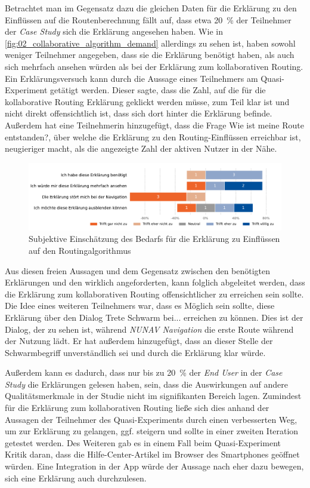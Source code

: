 Betrachtet man im Gegensatz dazu die gleichen Daten für die Erklärung zu den Einflüssen auf die Routenberechnung fällt auf, dass etwa 20~\% der Teilnehmer der \textit{Case Study} sich die Erklärung angesehen haben. Wie in \autoref{fig:02_collaborative_algorithm_demand} allerdings zu sehen ist, haben sowohl weniger Teilnehmer angegeben, dass sie die Erklärung benötigt haben, als auch sich mehrfach ansehen würden als bei der Erklärung zum kollaborativen Routing. Ein Erklärungsversuch kann durch die Aussage eines Teilnehmers am Quasi-Experiment getätigt werden. Dieser sagte, dass die Zahl, auf die für die kollaborative Routing Erklärung geklickt werden müsse, zum Teil klar ist und nicht direkt offensichtlich ist, dass sich dort hinter die Erklärung befinde. Außerdem hat eine Teilnehmerin hinzugefügt, dass die Frage \glqq Wie ist meine Route entstanden?\grqq{}, über welche die Erklärung zu den Routing-Einflüssen erreichbar ist, neugieriger macht, als die angezeigte Zahl der aktiven Nutzer in der Nähe.

\begin{figure}[htb!]
    \centering
    \includegraphics[width=\textwidth]{contents/06_model_evaluation/02_evaluation/res/qualitativeFeedback-02_collaborative_algorithm_demand.pdf}
    \caption{Subjektive Einschätzung des Bedarfs für die Erklärung zu Einflüssen auf den Routingalgorithmus}
    \label{fig:02_collaborative_algorithm_demand}
\end{figure}

Aus diesen freien Aussagen und dem Gegensatz zwischen den benötigten Erklärungen und den wirklich angeforderten, kann folglich abgeleitet werden, dass die Erklärung zum kollaborativen Routing offensichtlicher zu erreichen sein sollte. Die Idee eines weiteren Teilnehmers war, dass es Möglich sein sollte, diese Erklärung über den Dialog \glqq Trete Schwarm bei...\grqq{} erreichen zu können. Dies ist der Dialog, der zu sehen ist, während \textit{NUNAV Navigation} die erste Route während der Nutzung lädt. Er hat außerdem hinzugefügt, dass an dieser Stelle der Schwarmbegriff unverständlich sei und durch die Erklärung klar würde.

Außerdem kann es dadurch, dass nur bis zu 20~\% der \textit{End User} in der \textit{Case Study} die Erklärungen gelesen haben, sein, dass die Auswirkungen auf andere Qualitätsmerkmale in der Studie nicht im signifikanten Bereich lagen. Zumindest für die Erklärung zum kollaborativen Routing ließe sich dies anhand der Aussagen der Teilnehmer des Quasi-Experiments durch einen verbesserten Weg, um zur Erklärung zu gelangen, ggf. steigern und sollte in einer zweiten Iteration getestet werden. Des Weiteren gab es in einem Fall beim Quasi-Experiment Kritik daran, dass die Hilfe-Center-Artikel im Browser des Smartphones geöffnet würden. Eine Integration in der App würde der Aussage nach eher dazu bewegen, sich eine Erklärung auch durchzulesen.

